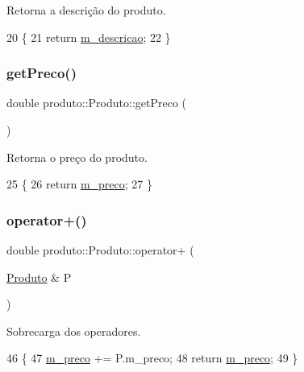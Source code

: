Retorna a descrição do produto. 


\begin{DoxyCode}
20                           \{
21         \textcolor{keywordflow}{return} \hyperlink{classproduto_1_1Produto_a17af898b167c20f905f3d2d16f7aeac0}{m\_descricao};
22     \}
\end{DoxyCode}
\mbox{\label{classproduto_1_1Produto_ac316d4a9e294ba556de0ce7860b7f8cf}} 
\subsubsection{\texorpdfstring{get\+Preco()}{getPreco()}}
{\footnotesize\ttfamily double produto\+::\+Produto\+::get\+Preco (\begin{DoxyParamCaption}{ }\end{DoxyParamCaption})}



Retorna o preço do produto. 


\begin{DoxyCode}
25                       \{
26         \textcolor{keywordflow}{return} \hyperlink{classproduto_1_1Produto_aaa3f0f133345202eafcb2fa72248e05d}{m\_preco};
27     \}
\end{DoxyCode}
\mbox{\label{classproduto_1_1Produto_a533fce73a66e09411c27ba8a71d985ef}} 
\subsubsection{\texorpdfstring{operator+()}{operator+()}}
{\footnotesize\ttfamily double produto\+::\+Produto\+::operator+ (\begin{DoxyParamCaption}\item[{\hyperlink{classproduto_1_1Produto}{Produto} \&}]{P }\end{DoxyParamCaption})}



Sobrecarga dos operadores. 


\begin{DoxyCode}
46     \{
47         \hyperlink{classproduto_1_1Produto_aaa3f0f133345202eafcb2fa72248e05d}{m\_preco} += P.m\_preco;
48         \textcolor{keywordflow}{return} \hyperlink{classproduto_1_1Produto_aaa3f0f133345202eafcb2fa72248e05d}{m\_preco};
49     \}
\end{DoxyCode}
\mbox{\label{classproduto_1_1Produto_aa9bd99956208c019f714a4ed53d6986c}} 
